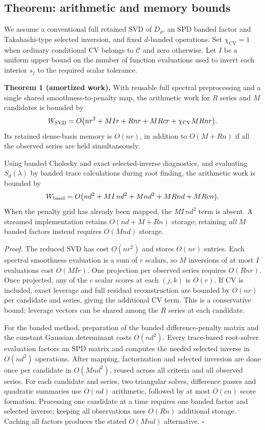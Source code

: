 \subsection{Theorem: arithmetic and memory bounds}
We assume a conventional full retained SVD of $D_d$,
an SPD banded factor and Takahashi-type selected
inversion, and fixed $d$-banded operations.
Set $\chi_{\mathrm{CV}}=1$ when ordinary
conditional CV belongs to $\mathcal C$ and zero
otherwise. Let $I$ be a uniform upper bound on
the number of function evaluations used to
invert each interior $s_j$ to the required
scalar tolerance.

\noindent\textbf{Theorem 1 (amortized work).}
With reusable full spectral preprocessing and a
single shared smoothness-to-penalty map, the
arithmetic work for $R$ series and $M$ candidates
is bounded by
\begin{equation}\label{eq:theory_spectral_bound}
W_{\rm SVD}
=O\bigl(nr^2+MIr+Rnr+MRcr
+\chi_{\rm CV}MRnr\bigr).
\end{equation}
Its retained dense-basis memory is $O(nr)$, in
addition to $O(M+Rn)$ if all the observed
series are held simultaneously.

Using banded Cholesky and exact selected-inverse
diagnostics, and evaluating $S_d(\lambda)$
by banded trace calculations during root finding,
the arithmetic work is bounded by
\begin{equation}\label{eq:theory_banded_bound}
W_{\rm band}
=O\bigl(nd^2+MI\,nd^2+Mnd^2
+MRnd+MRcn\bigr).
\end{equation}
When the penalty grid has already been mapped,
the $MI\,nd^2$ term is absent. A streamed
implementation retains $O(nd+M+Rn)$ storage;
retaining \emph{all} $M$ banded factors instead
requires $O(Mnd)$ storage.

\noindent\emph{Proof.}
The reduced SVD has cost $O(nr^2)$ and
stores $O(nr)$ entries. Each spectral
smoothness evaluation is a sum of $r$
scalars, so $M$ inversions of at most $I$
evaluations cost $O(MIr)$. One projection
per observed series requires $O(Rnr)$.
Once projected, any of the $c$ scalar
scores at each $(j,k)$ is $O(r)$.
If CV is included, exact leverage and
full residual reconstruction are bounded
by $O(nr)$ per candidate and series,
giving the additional CV term.
This is a conservative bound; leverage
vectors can be shared among the $R$
series at each candidate.

For the banded method, preparation of the
banded difference-penalty matrix and the
constant Gaussian determinant costs
$O(nd^2)$. Every trace-based root-solver
evaluation factors an SPD matrix and
computes the needed selected inverse in
$O(nd^2)$ operations. After mapping,
factorization and selected inversion are
done once per candidate in $O(Mnd^2)$,
reused across all criteria and all
observed series. For each candidate
and series, two triangular solves,
difference passes and quadratic summaries
use $O(nd)$ arithmetic, followed by
at most $O(cn)$ score formation.
Processing one candidate at a time
requires one banded factor and selected
inverse; keeping all observations
uses $O(Rn)$ additional storage.
Caching all factors produces the
stated $O(Mnd)$ alternative.
\hfill$\square$

